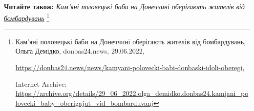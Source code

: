  
 
 
 
 


\textbf{Читайте також:} \href{https://archive.org/details/29_06_2022.olga_demidko.donbas24.kamjani_polovecki_baby_oberigajut_vid_bombarduvanj}{\emph{Кам'яні половецькі баби на Донеччині оберігають жителів від бомбардувань}}%
\footnote{Кам'яні половецькі баби на Донеччині оберігають жителів від бомбардувань, Ольга Демідко, donbas24.news, 29.06.2022, \par%
\url{https://donbas24.news/news/kamyani-polovecki-babi-donbaski-idoli-oberegi}, \par%
Internet Archive: \url{https://archive.org/details/29_06_2022.olga_demidko.donbas24.kamjani_polovecki_baby_oberigajut_vid_bombarduvanj}%
}
